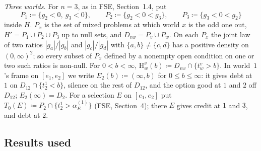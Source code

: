 \documentclass[11pt]{article}
\theoremstyle{definition}\newtheorem{definition}[theorem]{Definition}
\theoremstyle{remark}\newtheorem{remark}[theorem]{Remark}
\newcommand{\Hi}[3]{\mathrm H^{#1}_{#2}(#3)}
\begin{document}
\emph{Three worlds.} For $n=3$, as in FSE, Section~1.4, put
\[
 P_1\coloneqq\{g_2<0,\ g_3<0\},\qquad P_2\coloneqq\{g_2<0<g_3\},\qquad
 P_3\coloneqq\{g_3<0<g_2\}
\]
inside $H$. $P_x$ is the set of mixed problems at which world $x$ is the
odd one out, $H'=P_1\cup P_2\cup P_3$ up to null sets, and
$D_{vw}=P_v\cup P_w$. On each $P_x$ the joint law of two ratios
$|g_a|/|g_b|$ and $|g_c|/|g_d|$ with $\{a,b\}\ne\{c,d\}$ has a positive
density on $(0,\infty)^2$; so every subset of $P_x$ defined by a nonempty
open condition on one or two such ratios is non-null. For $0<b<\infty$,
$\Hi vwb\coloneqq D_{vw}\cap\{t^v_w>b\}$. In world~$1$'s frame on
$[e_1,e_2]$ we write $E_2(b)\coloneqq(\infty,b)$ for $0\le b\le\infty$: it
gives debt at $1$ on $D_{12}\cap\{t^1_2<b\}$, silence on the rest of
$D_{12}$, and the option good at $1$ and $2$ off $D_{12}$; $E_2(\infty)=D_2$.
For a selection $E$ on $[e_1,e_2]$ put $T_0(E)\coloneqq P_2\cap
\{t^1_2>\alpha^{(1)}_E\}$ (FSE, Section~4); there $E$ gives credit at $1$
and $3$, and debt at $2$.

\subsection{Results used}\label{sec:inputs}
\end{document}
